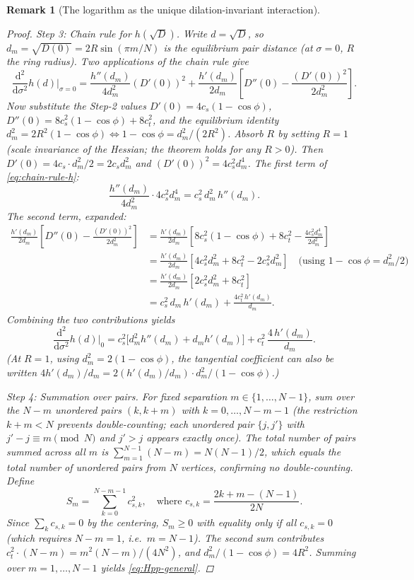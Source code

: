 \documentclass[12pt, a4paper]{article}
\newtheorem{remark}{Remark}[section]
\numberwithin{equation}{section}
\newcommand{\dd}{\mathrm{d}}
\begin{document}
\begin{remark}[The logarithm as the unique dilation-invariant interaction]
\begin{proof}
\emph{Step 3: Chain rule for $h(\sqrt{D})$.}
Write $d = \sqrt{D}$, so $d_m = \sqrt{D(0)} = 2R\sin(\pi m/N)$
is the equilibrium pair distance (at $\sigma = 0$, $R$ the
ring radius).  Two applications of the chain rule give
\begin{equation}\label{eq:chain-rule-h}
  \frac{\dd^2}{\dd\sigma^2}h(d)\bigg|_{\sigma=0}
  = \frac{h''(d_m)}{4d_m^2}(D'(0))^2
  + \frac{h'(d_m)}{2d_m}\!\left[D''(0) - \frac{(D'(0))^2}{2d_m^2}\right].
\end{equation}
Now substitute the Step-2 values
$D'(0) = 4c_s(1-\cos\phi)$, $D''(0) = 8c_s^2(1-\cos\phi) + 8c_t^2$,
and the equilibrium identity
$d_m^2 = 2R^2(1-\cos\phi) \Leftrightarrow 1-\cos\phi
= d_m^2/(2R^2)$.  Absorb $R$ by setting $R = 1$ (scale invariance
of the Hessian; the theorem holds for any $R > 0$).
Then $D'(0) = 4c_s\cdot d_m^2/2 = 2c_s d_m^2$ and
$(D'(0))^2 = 4c_s^2 d_m^4$.  The first term of
\eqref{eq:chain-rule-h}:
\[
  \frac{h''(d_m)}{4d_m^2}\cdot 4c_s^2 d_m^4
  = c_s^2\,d_m^2\,h''(d_m).
\]
The second term, expanded:
\begin{align*}
  \frac{h'(d_m)}{2d_m}\!\left[D''(0) - \frac{(D'(0))^2}{2d_m^2}\right]
  &= \frac{h'(d_m)}{2d_m}\!\left[8c_s^2(1-\cos\phi) + 8c_t^2
     - \frac{4c_s^2 d_m^4}{2d_m^2}\right] \\
  &= \frac{h'(d_m)}{2d_m}\!\left[4c_s^2 d_m^2 + 8c_t^2 - 2c_s^2 d_m^2\right]
     \quad \text{(using $1-\cos\phi = d_m^2/2$)}\\
  &= \frac{h'(d_m)}{2d_m}\!\left[2c_s^2 d_m^2 + 8c_t^2\right] \\
  &= c_s^2\,d_m\,h'(d_m) + \frac{4c_t^2\,h'(d_m)}{d_m}.
\end{align*}
Combining the two contributions yields
\begin{equation}\label{eq:Hpp-per-pair}
  \frac{\dd^2}{\dd\sigma^2}h(d)\bigg|_0
  = c_s^2\bigl[d_m^2 h''(d_m) + d_m h'(d_m)\bigr]
  + c_t^2\,\frac{4\,h'(d_m)}{d_m}.
\end{equation}
(At $R = 1$, using $d_m^2 = 2(1{-}\cos\phi)$, the tangential
coefficient can also be written $4h'(d_m)/d_m
= 2(h'(d_m)/d_m)\cdot d_m^2 / (1{-}\cos\phi)$.)

\emph{Step 4: Summation over pairs.}
For fixed separation $m \in \{1, \ldots, N{-}1\}$, sum over the
$N-m$ unordered pairs $(k, k{+}m)$ with $k = 0, \ldots, N{-}m{-}1$
(the restriction $k + m < N$ prevents double-counting; each unordered
pair $\{j, j'\}$ with $j' - j \equiv m \pmod{N}$ and $j' > j$ appears
exactly once).  The total number of pairs summed across all $m$ is
$\sum_{m=1}^{N-1}(N-m) = N(N-1)/2$, which equals the total number of
unordered pairs from $N$ vertices, confirming no double-counting.
Define
\[
  S_m = \sum_{k=0}^{N-m-1} c_{s,k}^2, \quad
  \text{where } c_{s,k} = \frac{2k + m - (N{-}1)}{2N}.
\]
Since $\sum_k c_{s,k} = 0$ by the centering, $S_m \ge 0$ with equality
only if all $c_{s,k} = 0$ (which requires $N - m = 1$, i.e.\ $m = N-1$).
The second sum contributes $c_t^2 \cdot (N{-}m) = m^2(N{-}m)/(4N^2)$,
and $d_m^2/(1{-}\cos\phi) = 4R^2$.  Summing over $m = 1, \ldots, N-1$
yields \eqref{eq:Hpp-general}.


\end{proof}
\end{remark}
\end{document}
